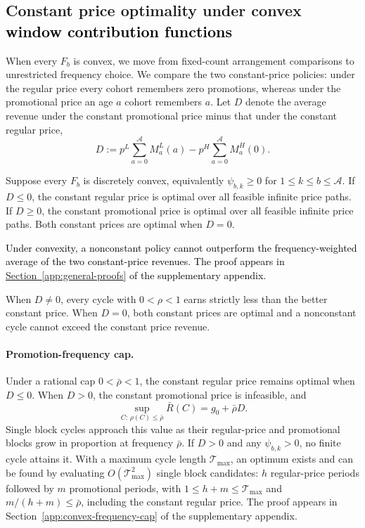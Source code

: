 \subsection{\texorpdfstring{Constant price optimality under convex \textcolor{black}{window contribution functions}}{Constant price optimality under convex window contribution functions}}
\label{sec:general-single-transition-frequency}

When every \(F_b\) is convex, we move from fixed-count arrangement comparisons to unrestricted frequency choice. We compare the two constant-price policies: under the regular price every cohort remembers zero promotions, whereas under the promotional price an age \(a\) cohort remembers \(a\). Let \(D\) denote the average revenue under the constant promotional price minus that under the constant regular price,
\[
    D
    :=
    p^{L}\sum_{a=0}^{\mathcal A}M_a^L(a)
    -
    p^{H}\sum_{a=0}^{\mathcal A}M_a^H(0).
\]

\begin{proposition}
    \label{prop:general-cluster-frequency}
Suppose every \(F_b\) is discretely convex, equivalently \(\psi_{b,k}\ge0\) for \(1\le k\le b\le\mathcal A\). If \(D\le0\), the constant regular price is optimal over all feasible infinite price paths. If \(D\ge0\), the constant promotional price is optimal over all feasible infinite price paths. Both constant prices are optimal when \(D=0\).
\end{proposition}

\textcolor{black}{Under convexity, a nonconstant policy cannot outperform the frequency-weighted average of the two constant-price revenues. The proof appears in \hyperref[app:constant-price-proof]{Section~\ref*{app:general-proofs}} of the supplementary appendix.}

When \(D\ne0\), every cycle with \(0<\rho<1\) earns strictly less than the better constant price. When \(D=0\), both constant prices are optimal and a nonconstant cycle cannot exceed the constant price revenue.

\begingroup\color{black}
\paragraph{Promotion-frequency cap.}
Under a rational cap \(0<\bar\rho<1\), the constant regular price remains optimal when \(D\le0\). When \(D>0\), the constant promotional price is infeasible, and
\[
    \sup_{C:\,\rho(C)\le\bar\rho}\bar R(C)=g_0+\bar\rho D.
\]
Single block cycles approach this value as their regular-price and promotional blocks grow in proportion at frequency \(\bar\rho\). If \(D>0\) and any \(\psi_{b,k}>0\), no finite cycle attains it. With a maximum cycle length \(\mathcal T_{\max}\), an optimum exists and can be found by evaluating \(O(\mathcal T_{\max}^2)\) single block candidates: \(h\) regular-price periods followed by \(m\) promotional periods, with \(1\le h+m\le\mathcal T_{\max}\) and \(m/(h+m)\le\bar\rho\), including the constant regular price. The proof appears in Section~\ref{app:convex-frequency-cap} of the supplementary appendix.
\par\endgroup

